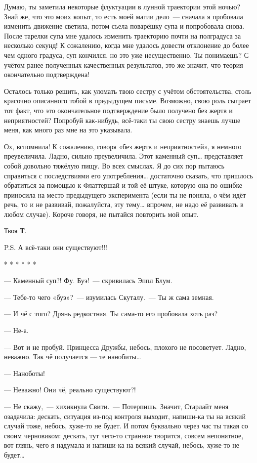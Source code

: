 \documentclass[fontsize=11pt,a5paper,titlepage=firstcover]{scrbook}
\begin{document}
Думаю, ты заметила некоторые флуктуации в лунной траектории этой ночью? Знай же, что это моих копыт, то есть моей магии дело~--- сначала я пробовала изменить движение светила, потом съела поварёшку супа и попробовала снова. После тарелки супа мне удалось изменить траекторию почти на полградуса за несколько секунд! К сожалению, когда мне удалось довести отклонение до более чем одного градуса, суп кончился, но это уже несущественно. Ты понимаешь? С учётом ранее полученных качественных результатов, это же значит, что теория окончательно подтверждена!

Осталось только решить, как уломать твою сестру с учётом обстоятельства, столь красочно описанного тобой в предыдущем письме. Возможно, свою роль сыграет тот факт, что это окончательное подтверждение было получено без жертв и неприятностей? Попробуй как-нибудь, всё-таки ты свою сестру знаешь лучше меня, как много раз мне на это указывала.

Ох, вспомнила! К сожалению, говоря «без жертв и неприятностей», я немного преувеличила. Ладно, сильно преувеличила. Этот каменный суп{\ldots} представляет собой довольно тяжёлую пищу. Во всех смыслах. Я до сих пор пытаюсь справиться с последствиями его употребления{\ldots} достаточно сказать, что пришлось обратиться за помощью к Флаттершай и той её штуке, которую она по ошибке приносила на место предыдущего эксперимента (если ты не поняла, о чём идёт речь, то и не развивай, пожалуйста, эту тему{\ldots} впрочем, не надо её развивать в любом случае). Короче говоря, не пытайся повторить мой опыт.
\begin{flushright}Твоя \textbf{Т}.\end{flushright}
P.S. А всё-таки они существуют!!!
\begin{center}
	* * * * * *
\end{center}

--- Каменный суп?! Фу. Буэ!~--- скривилась Эппл Блум.

--- Тебе-то чего «буэ»?~--- изумилась Скуталу.~--- Ты ж сама земная.

--- И чё с того? Дрянь редкостная. Ты сама-то его пробовала хоть раз?

--- Не-а.

--- Вот и не пробуй. Принцесса Дружбы, небось, плохого не посоветует. Ладно, неважно. Так чё получается --- те нанобиты{\ldots}

--- Наноботы!

--- Неважно! Они чё, реально существуют?!

--- Не скажу,~--- хихикнула Свити.~--- Потерпишь. Значит, Старлайт меня озадачила: дескать, ситуация из-под контроля выходит, напиши-ка ты на всякий случай тоже, небось, хуже-то не будет. И потом буквально через час ты такая со своим черновиком: дескать, тут чего-то странное творится, совсем непонятное, вот глянь, чего я надумала и напиши-ка на всякий случай, небось, хуже-то не будет{\ldots}
\end{document}
